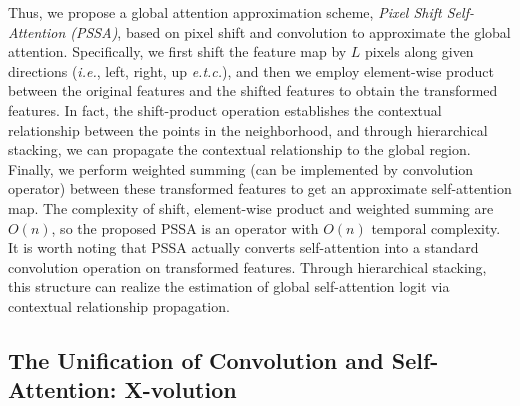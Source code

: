 \documentclass{article}
\begin{document}
Thus, we propose a global attention approximation scheme, \emph{Pixel Shift Self-Attention (PSSA)}, based on pixel shift and convolution to approximate the global attention.
Specifically, we first shift the feature map by $L$ pixels along given directions (\emph{i.e.}, left, right, up \emph{e.t.c.}), and then we employ element-wise product between the original features and the shifted features to obtain the transformed features.
In fact, the shift-product operation establishes the contextual relationship between the points in the neighborhood, and through hierarchical stacking, we can propagate the contextual relationship to the global region.
Finally, we perform weighted summing (can be implemented by convolution operator) between these transformed features to get an approximate self-attention map.
The complexity of shift, element-wise product and weighted summing are $O(n)$, so the proposed PSSA is an operator with $O(n)$ temporal complexity.
It is worth noting that PSSA actually converts self-attention into a standard convolution operation on transformed features.
Through hierarchical stacking, this structure can realize the estimation of global self-attention logit via contextual relationship propagation.





\subsection{The Unification of Convolution and Self-Attention: X-volution}
\end{document}
